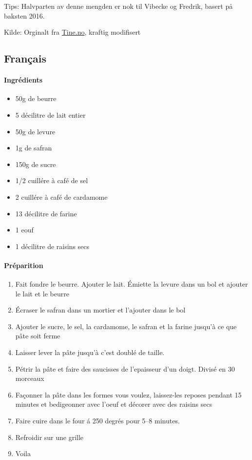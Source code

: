 Tips: Halvparten av denne mengden er nok til Vibecke og Fredrik, basert på baksten 2016.

Kilde: Orginalt fra \href{http://www.tine.no/oppskrifter/bakst/sot-gjarbakst/lussekatter}{Tine.no}, kraftig modifisert


\subsection{Français}
\paragraph{Ingrédients}
\begin{itemize}[noitemsep]
	\item 50g de beurre
	\item 5 décilitre de lait entier
	\item 50g de levure
	\item 1g de safran
	\item 150g de sucre
	\item 1/2 cuillére à café de sel
	\item 2 cuillére à café de cardamome
	\item 13 décilitre de farine
	\item 1 eouf
	\item 1 décilitre de raisins secs
\end{itemize}

\paragraph{Préparition}
\begin{enumerate}[noitemsep]
	\item Fait fondre le beurre. Ajouter le lait. Émiette la levure dans un bol et ajouter le lait et le beurre
	\item Écraser le safran dans un mortier et l'ajouter  dans le bol
	\item Ajouter le sucre, le sel, la cardamome, le safran et la farine jusqu'à ce que pâte soit ferme
	\item Laisser lever la pâte jusqu'à c'est doublé de taille.
	\item Pétrir la pâte et faire des saucisses de l'epaisseur d'un doigt. Divisé en 30 morceaux
	\item Façonner la pâte dans les formes vous voulez, laissez-les reposes pendant 15 minutes et bedigeonner avec l'oeuf et décorer avec des raisins secs
	\item Faire cuire dans le four á 250 degrés pour 5--8 minutes.
	\item Refroidir sur une grille
	\item Voila
\end{enumerate}



